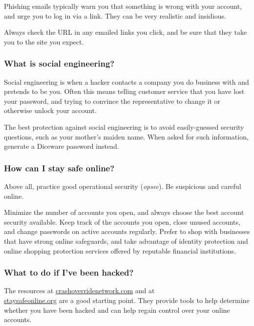 Phishing emails typically warn you that something is wrong with your account, and urge you to log in via a link. They can be very realistic and insidious.

Always check the URL in any emailed links you click, and be sure that they take you to the site you expect.

\subsubsection{What is social engineering?}

Social engineering is when a hacker contacts a company you do business with and pretends to be you. Often this means telling customer service that you have lost your password, and trying to convince the representative to change it or otherwise unlock your account.

The best protection against social engineering is to avoid easily-guessed security questions, such as your mother's maiden name. When asked for such information, generate a Diceware password instead.

\subsubsection{How can I stay safe online?}

Above all, practice good operational security (\textit{opsec}). Be suspicious and careful online. 

Minimize the number of accounts you open, and always choose the best account security available. Keep track of the accounts you open, close unused accounts, and change passwords on active accounts regularly. Prefer to shop with businesses that have strong online safeguards, and take advantage of identity protection and online shopping protection services offered by reputable financial institutions.

\subsubsection{What to do if I've been hacked?}

The resources at \url{crashoverridenetwork.com} and at \\  \url{staysafeonline.org} are a good starting point. They provide tools to help determine whether you have been hacked and can help regain control over your online accounts.
